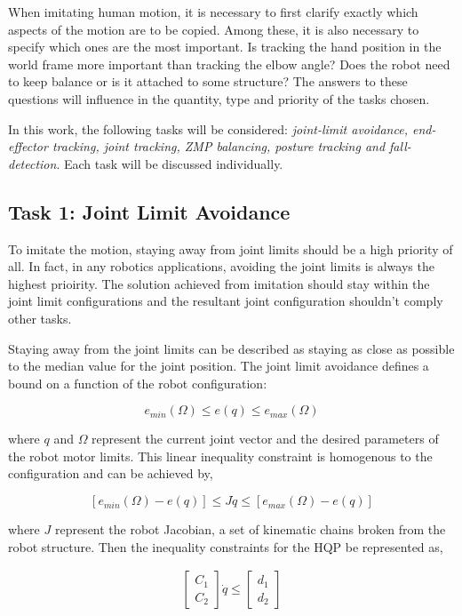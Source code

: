 When imitating human motion, it is necessary to first clarify exactly which aspects of the motion are to be copied. Among these, it is also necessary to specify which ones 
are the most important. Is tracking the hand position in the world frame more important than tracking the elbow angle? Does the robot need to keep balance or is it attached 
to some structure? The answers to these questions will influence in the quantity, type and priority of the tasks chosen.

In this work, the following tasks will be considered: \textit{joint-limit avoidance, end-effector tracking, joint tracking, ZMP balancing, posture tracking and fall-detection}.
Each task will be discussed individually.

\subsection[Joint Limit Avoidance]{Task 1: Joint Limit Avoidance}
To imitate the motion, staying away from joint limits should be a high priority of all. In fact, in any robotics applications, avoiding the joint limits
is always the highest prioirity. The solution achieved from imitation should stay within the joint limit configurations and the resultant joint configuration 
shouldn't comply other tasks. 

Staying away from the joint limits can be described as staying as close as possible to the median value for the joint position.
The joint limit avoidance defines a bound on a function of the robot configuration:

\begin{equation}
    \label{eq: joint-limit-1}
    e_{min}(\Omega) \le e(q) \le e_{max}(\Omega)
\end{equation}

where $q$ and $\Omega$ represent the current joint vector and the desired parameters of the robot motor limits. 
This linear inequality constraint is homogenous to the configuration and can be achieved by,

\begin{equation}
    \label{eq: joint-limit-2}
    [e_{min}(\Omega) - e(q)] \le J\dot{q} \le [e_{max}(\Omega) - e(q)]
\end{equation}

where $J$ represent the robot Jacobian, a set of kinematic chains broken from the robot structure.
Then the inequality constraints for the HQP be represented as,

\begin{align}
    \label{eq: joint-limit-3}
    \begin{bmatrix}
        C_1 \\ C_2
    \end{bmatrix} \dot{q} \le 
    \begin{bmatrix}
        d_1 \\ d_2
    \end{bmatrix}
\end{align}


